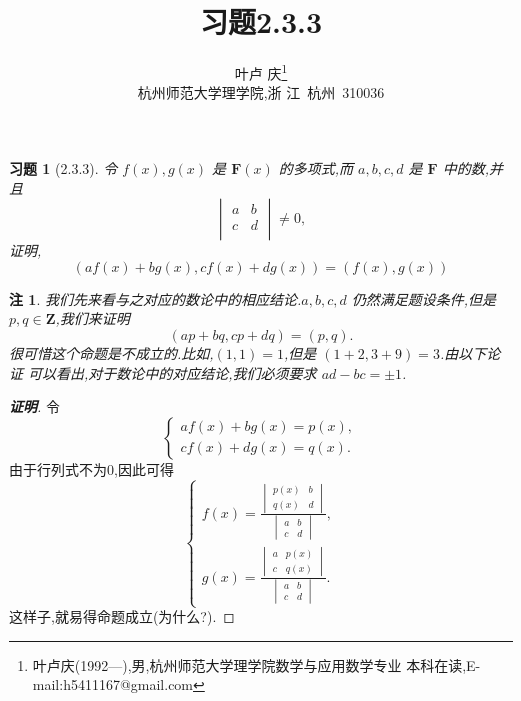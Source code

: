 \documentclass[twoside,11pt]{article}
\newtheorem*{exercise}{习题}
\newtheorem{remark}{注}
\begin{document}
\title{\huge{\bf{习题2.3.3}}} \author{\small{叶卢
    庆\footnote{叶卢庆(1992---),男,杭州师范大学理学院数学与应用数学专业
      本科在读,E-mail:h5411167@gmail.com}}\\{\small{杭州师范大学理学院,浙
      江~杭州~310036}}} \date{}
\maketitle






\vspace{30pt} %
\begin{exercise}[2.3.3]
令 $f(x),g(x)$ 是 $\mathbf{F}(x)$ 的多项式,而 $a,b,c,d$ 是
$\mathbf{F}$ 中的数,并且
$$
\begin{vmatrix}
  a&b\\
c&d\\
\end{vmatrix}\neq 0,
$$
证明,
$$
(af(x)+bg(x),cf(x)+dg(x))=(f(x),g(x))
$$  
\end{exercise}
\begin{remark}
  我们先来看与之对应的数论中的相应结论.$a,b,c,d$ 仍然满足题设条件,但是
  $p,q\in \mathbf{Z}$,我们来证明
$$
(ap+bq,cp+dq)=(p,q).
$$
很可惜这个命题是不成立的.比如,$(1,1)=1$,但是 $(1+2,3+9)=3$.由以下论证
可以看出,对于数论中的对应结论,我们必须要求 $ad-bc=\pm 1$.
\end{remark}
\begin{proof}[\bf{证明}]
令 
$$
\begin{cases}
  af(x)+bg(x)=p(x),\\
cf(x)+dg(x)=q(x).
\end{cases}
$$
由于行列式不为0,因此可得
$$
\begin{cases}
  f(x)=\frac{\begin{vmatrix}
      p(x)&b\\
q(x)&d
    \end{vmatrix}}{\begin{vmatrix}
      a&b\\
c&d
    \end{vmatrix}},\\
g(x)=\frac{\begin{vmatrix}
    a&p(x)\\
c&q(x)
  \end{vmatrix}}{\begin{vmatrix}
    a&b\\
c&d
  \end{vmatrix}}.
\end{cases}
$$
这样子,就易得命题成立(为什么?).
\end{proof}

% 
\end{document}
